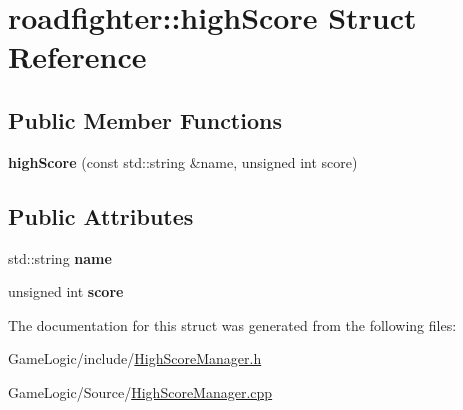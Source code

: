 \hypertarget{structroadfighter_1_1highScore}{}\section{roadfighter\+:\+:high\+Score Struct Reference}
\label{structroadfighter_1_1highScore}
\subsection*{Public Member Functions}
\begin{DoxyCompactItemize}
\item 
\mbox{\label{structroadfighter_1_1highScore_a3a67cd6ffadc68d7ef497a2d8bd83c05}} 
{\bfseries high\+Score} (const std\+::string \&name, unsigned int score)
\end{DoxyCompactItemize}
\subsection*{Public Attributes}
\begin{DoxyCompactItemize}
\item 
\mbox{\label{structroadfighter_1_1highScore_a9d1ffd2a7ea8a0eaedda4668be5c4994}} 
std\+::string {\bfseries name}
\item 
\mbox{\label{structroadfighter_1_1highScore_a244094acbf1e4bac6af7983ff732c678}} 
unsigned int {\bfseries score}
\end{DoxyCompactItemize}


The documentation for this struct was generated from the following files\+:\begin{DoxyCompactItemize}
\item 
Game\+Logic/include/\hyperlink{HighScoreManager_8h}{High\+Score\+Manager.\+h}\item 
Game\+Logic/\+Source/\hyperlink{HighScoreManager_8cpp}{High\+Score\+Manager.\+cpp}\end{DoxyCompactItemize}
